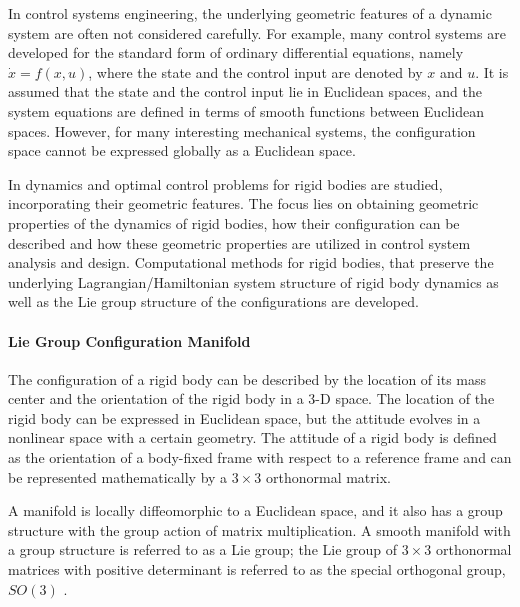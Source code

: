 In control systems engineering, the underlying geometric features of a dynamic system are often not considered carefully. For example, many control systems are developed for the standard form of ordinary differential equations, namely $ \dot{x}=f(x,u) $, where the state and the control input are denoted by $ x $ and $ u $. It is assumed that the state and the control input lie in Euclidean spaces, and the system equations are defined in terms of smooth functions between Euclidean spaces. However, for many interesting mechanical systems, the configuration space cannot be expressed globally as a Euclidean space.

In \cite{Lee2008} dynamics and optimal control problems for rigid bodies are studied, incorporating their geometric features. The focus lies on obtaining geometric properties of the dynamics of rigid bodies, how their configuration can be described and how these geometric properties are utilized in control system analysis and design. Computational methods for rigid bodies, that preserve the underlying Lagrangian/Hamiltonian system structure of rigid body dynamics as well as the Lie group structure of the configurations are developed.

\paragraph{Lie Group Configuration Manifold} 
The configuration of a rigid body can be described by the location of its mass center and the orientation of the rigid body in a 3-D space. The location of the rigid body can be expressed in Euclidean space, but the attitude evolves in a nonlinear space with a certain geometry. The attitude of a rigid body is defined as the orientation of a body-fixed frame with respect to a reference frame
and can be represented mathematically by a $ 3\times 3 $ orthonormal matrix. 

A manifold is locally diffeomorphic to a Euclidean space, and it also has a group structure with the group action of matrix multiplication. A smooth manifold with a group structure is referred to as a Lie group; the Lie group of $ 3\times 3 $ orthonormal matrices with positive determinant is referred to as the special orthogonal group, $ SO(3) $ \cite{Murray1994}.



